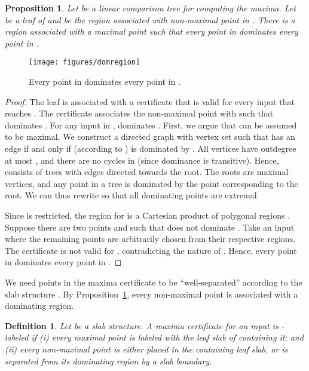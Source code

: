 \documentclass[letterpaper,11pt]{article}
\newtheorem{definition}[theorem]{Definition}
\newtheorem{prop}[theorem]{Proposition}
\begin{document}
\begin{prop}\label{prop:dom} 
  Let  be a linear comparison
  tree for computing the maxima.
  Let  be a leaf of  
  and  be the region 
  associated with non-maximal point 
   in . 
  There is a region 
  associated with a maximal point  
  such that every point in 
  dominates every point in .
\end{prop}
\begin{figure}
\centering
\texttt{[image: figures/domregion]}
\caption{Every point in  dominates every point in .}
\label{fig:domregion}
\end{figure}

\begin{proof} 
The leaf  is associated with a 
certificate  that is valid 
for every input that reaches . 
The certificate  associates 
the non-maximal point  with 
 such that  dominates . 
For any input  in ,  
dominates . First, we argue 
that  can be assumed to be 
maximal. We construct a directed graph 
 with vertex set 
such that  has an edge  
if and only if (according to 
)  is dominated by 
. All vertices have outdegree at most 
, and there are no cycles in  
(since dominance is transitive).
Hence,  consists of trees with 
edges directed towards the root.
The roots are maximal vertices, and any 
point in a tree is dominated by the point 
corresponding to the root. We can thus
rewrite  so that all dominating 
points are extremal.

Since  is restricted, the 
region  
for  is a Cartesian product 
of polygonal regions .
Suppose there are two points
 and 
such that  does not dominate . 
Take an input  where the
remaining points are arbitrarily chosen from their 
respective regions. The certificate 
is not valid for , contradicting the 
nature of .
Hence, every point in  dominates every point 
in . 
\end{proof}

We need points 
in the maxima certificate to be 
``well-separated'' according to 
the slab structure . 
By Proposition~\ref{prop:dom},
every non-maximal point is associated with a dominating
region.

\begin{definition}\label{def:s-label}
  Let  be a slab structure. 
  A maxima certificate for an input  is 
  \emph{-labeled} if (i)
  every maximal point is labeled with 
  the leaf slab of  containing it; and
  (ii) every non-maximal point is either 
  placed in the containing leaf slab,
  or is separated from its dominating 
  region by a slab boundary.
\end{definition}
\end{document}
